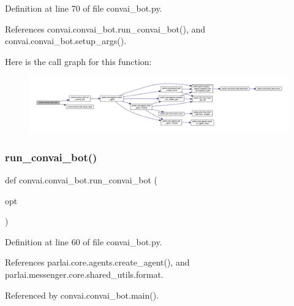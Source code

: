 Definition at line 70 of file convai\+\_\+bot.\+py.



References convai.\+convai\+\_\+bot.\+run\+\_\+convai\+\_\+bot(), and convai.\+convai\+\_\+bot.\+setup\+\_\+args().

Here is the call graph for this function\+:
\nopagebreak
\begin{figure}[H]
\begin{center}
\leavevmode
\includegraphics[width=350pt]{namespaceconvai_1_1convai__bot_abdce1d79f12edc77b5ff6c02b00d1219_cgraph}
\end{center}
\end{figure}
\mbox{\label{namespaceconvai_1_1convai__bot_aa48fc69074ce03959653a0122c4a0b67}} 
\subsubsection{\texorpdfstring{run\+\_\+convai\+\_\+bot()}{run\_convai\_bot()}}
{\footnotesize\ttfamily def convai.\+convai\+\_\+bot.\+run\+\_\+convai\+\_\+bot (\begin{DoxyParamCaption}\item[{}]{opt }\end{DoxyParamCaption})}



Definition at line 60 of file convai\+\_\+bot.\+py.



References parlai.\+core.\+agents.\+create\+\_\+agent(), and parlai.\+messenger.\+core.\+shared\+\_\+utils.\+format.



Referenced by convai.\+convai\+\_\+bot.\+main().

